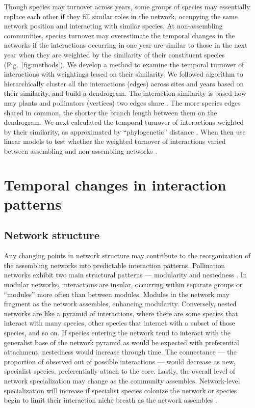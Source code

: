 \documentclass[12pt]{article}
\begin{document}
Though species may turnover across years, some groups of species may
essentially replace each other if they fill similar roles in the
network, occupying the same network position and interacting with
similar species. At non-assembling communities, species turnover may
overestimate the temporal changes in the networks if the interactions
occurring in one year are similar to those in the next year when they
are weighted by the similarity of their constituent species
(Fig.~\ref{fig:methods}). We develop a method to examine the temporal
turnover of interactions with weightings based on their similarity. We
followed \cite{ahn2010link} algorithm to hierarchically cluster all
the interactions (edges) across sites and years based on their
similarity, and build a dendrogram. The interaction similarity is
based how may plants and pollinators (vertices) two edges share
\citep{ahn2010link, kalinka2011linkcomm}. The more species edges
shared in common, the shorter the branch length between them on the
dendrogram.  We next calculated the temporal turnover of interactions
weighted by their similarity, as approximated by ``phylogenetic''
distance \citep{graham2008phylogenetic, picante-2010-1463}. When then
use linear models to test whether the weighted turnover of
interactions varied between assembling and non-assembling networks
\citep{lme4, lmetest}.

\section*{Temporal changes in interaction patterns}

\subsection*{Network structure}
Any changing points in network structure may contribute to the
reorganization of the assembling networks into predictable interaction
patterns. Pollination networks exhibit two main structural patterns
--- modularity \citep[e.g.,][]{Olesen2007} and nestedness
\citep[e.g.,][]{Bascompte2006, Bascompte2003}. In modular networks,
interactions are insular, occurring within separate groups or
``modules'' more often than between modules. Modules in the network
may fragment as the network assembles, enhancing
modularity. Conversely, nested networks are like a pyramid of
interactions, where there are some species that interact with many
species, other species that interact with a subset of those species,
and so on. If species entering the network tend to interact with the
generalist base of the network pyramid as would be expected with
preferential attachment, nestedness would increase through time. The
connectance --- the proportion of observed out of possible
interactions --- would decrease as new, specialist species,
preferentially attach to the core.  Lastly, the overall level of
network specialization may change as the community
assembles. Network-level specialization will increase if specialist
species colonize the network or species begin to limit their
interaction niche breath as the network assembles
\citep{bluthgen-2006-9}.
\end{document}
